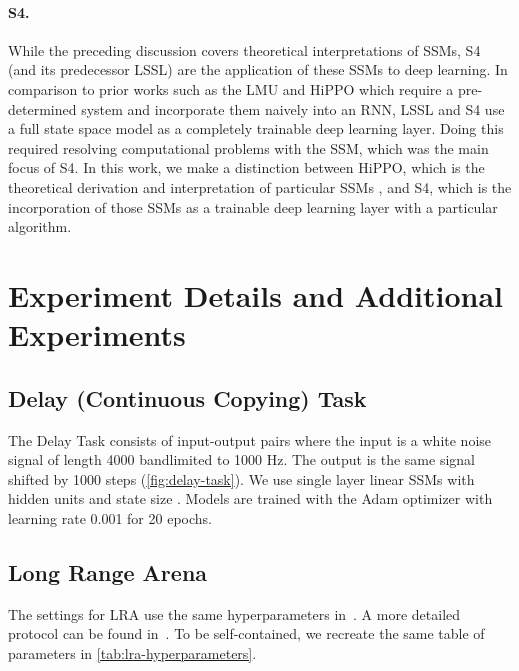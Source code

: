 \documentclass{article}
\begin{document}
\paragraph{S4.}
While the preceding discussion covers theoretical interpretations of SSMs,
S4 (and its predecessor LSSL) are the application of these SSMs to deep learning.
In comparison to prior works such as the LMU and HiPPO which require a pre-determined system  and incorporate them naively into an RNN,
LSSL and S4 use a full state space model  as a completely trainable deep learning layer. Doing this required resolving computational problems with the SSM, which was the main focus of S4.
In this work, we make a distinction between HiPPO, which is the theoretical derivation and interpretation of particular SSMs ,
and S4, which is the incorporation of those SSMs as a trainable deep learning layer with a particular algorithm.
 \section{Experiment Details and Additional Experiments}
\label{sec:experiment-details}


\subsection{Delay (Continuous Copying) Task}
The Delay Task consists of input-output pairs where the input is a white noise signal of length 4000 bandlimited to 1000 Hz.
The output is the same signal shifted by 1000 steps (\cref{fig:delay-task}).
We use single layer linear SSMs with  hidden units and state size .
Models are trained with the Adam optimizer with learning rate 0.001 for 20 epochs.

\subsection{Long Range Arena}

The settings for LRA use the same hyperparameters in~\citep{gu2022s4d}.
A more detailed protocol can be found in~\citep{gu2022s4d}.
To be self-contained, we recreate the same table of parameters in \cref{tab:lra-hyperparameters}.
\end{document}
